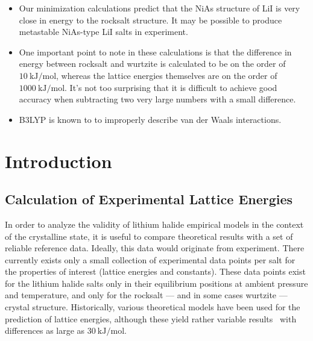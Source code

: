 \documentclass[preprint,aps,prb,floatfix]{revtex4-1}
\begin{document}
\begin{itemize}
	\item Our minimization calculations predict that the NiAs structure of LiI is very close in energy to the rocksalt structure. It may be possible to produce metastable NiAs-type LiI salts in experiment.
	\item One important point to note in these calculations is that the difference in energy between rocksalt and wurtzite is calculated to be on the order of $\SI{10}{\kilo\joule\per\mole}$, whereas the lattice energies themselves are on the order of $\SI{1000}{\kilo\joule\per\mole}$. It's not too surprising that it is difficult to achieve good accuracy when subtracting two very large numbers with a small difference.
	\item B3LYP is known to to improperly describe van der Waals interactions.
\end{itemize}


\section{Introduction}


\subsection{Calculation of Experimental Lattice Energies}

In order to analyze the validity of lithium halide empirical models in the context of the crystalline state, it is useful to compare theoretical results with a set of reliable reference data. Ideally, this data would originate from experiment. There currently exists only a small collection of experimental data points per salt for the properties of interest (lattice energies and constants). These data points exist for the lithium halide salts only in their equilibrium positions at ambient pressure and temperature, and only for the rocksalt --- and in some cases wurtzite --- crystal structure. Historically, various theoretical models have been used for the prediction of lattice energies, although these yield rather variable results~\cite{Ladd1959,book:CRC,Joung2008,Huggins1937} with differences as large as $\SI{30}{\kilo\joule\per\mole}$. 
\end{document}
